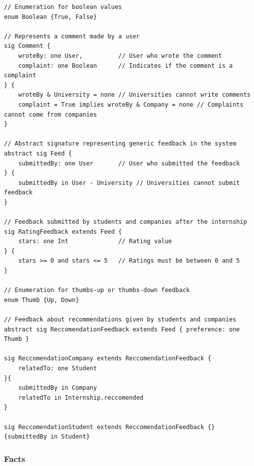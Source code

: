 \documentclass{article}
\begin{document}
\begin{lstlisting}
// Enumeration for boolean values
enum Boolean {True, False}

// Represents a comment made by a user
sig Comment {
    wroteBy: one User,          // User who wrote the comment
    complaint: one Boolean      // Indicates if the comment is a complaint
} {
    wroteBy & University = none // Universities cannot write comments
    complaint = True implies wroteBy & Company = none // Complaints cannot come from companies
}

// Abstract signature representing generic feedback in the system
abstract sig Feed {
    submittedBy: one User       // User who submitted the feedback
} {
    submittedBy in User - University // Universities cannot submit feedback
}

// Feedback submitted by students and companies after the internship
sig RatingFeedback extends Feed {
    stars: one Int              // Rating value
} {
    stars >= 0 and stars <= 5   // Ratings must be between 0 and 5
}

// Enumeration for thumbs-up or thumbs-down feedback
enum Thumb {Up, Down}

// Feedback about recommendations given by students and companies
abstract sig ReccomendationFeedback extends Feed { preference: one Thumb }

sig ReccomendationCompany extends ReccomendationFeedback {
	relatedTo: one Student
}{
	submittedBy in Company
	relatedTo in Internship.reccomended
}

sig ReccomendationStudent extends ReccomendationFeedback {} 
{submittedBy in Student}

\end{lstlisting}

\subsubsection{Facts}
\end{document}
